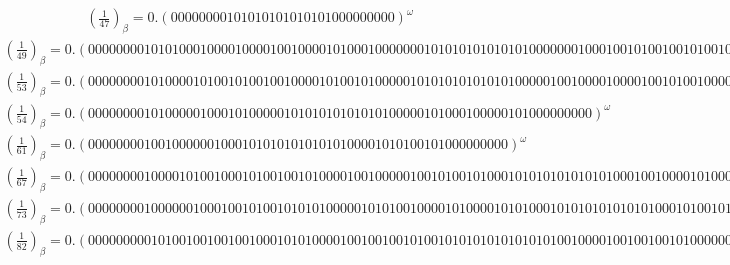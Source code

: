 \documentclass[fleqn]{article}
\begin{document}
\begin{equation*}
\begin{split}
(\frac{1}{47})_\beta = 0.(00000000101010101010101000000000)^\omega
\end{split}\end{equation*}
\begin{equation*}
\begin{split}
(\frac{1}{49})_\beta = 0.(0000000010101000100001000010010000101000100000001010101010101010000000100010010100100101001000100010101000000000)^\omega
\end{split}\end{equation*}
\begin{equation*}
\begin{split}
(\frac{1}{53})_\beta = 0.(000000001010000101001010010010000101001010000010101010101010100000100100001000010010100100001000101000000000)^\omega
\end{split}\end{equation*}
\begin{equation*}
\begin{split}
(\frac{1}{54})_\beta = 0.(000000001010000010001010000010101010101010100000101000100000101000000000)^\omega
\end{split}\end{equation*}
\begin{equation*}
\begin{split}
(\frac{1}{61})_\beta = 0.(000000001001000000100010101010101010100001010100101000000000)^\omega
\end{split}\end{equation*}
\begin{equation*}
\begin{split}
(\frac{1}{67})_\beta = 0.(0000000010000101001000101001001010000100100000100101001010001010101010101010001001000010100000010010001001001010100001000010001000000000)^\omega
\end{split}\end{equation*}
\begin{equation*}
\begin{split}
(\frac{1}{73})_\beta = 0.(0000000010000001000100101001010101000001010100100001010000101010001010101010101010001010010100001000010000000101000000001010010001001000001000000000)^\omega
\end{split}\end{equation*}
\begin{equation*}
\begin{split}
(\frac{1}{82})_\beta = 0.(000000000101001001001001000101010000100100100101001010101010101010100100001001001001010000000100100100100100001000000000)^\omega
\end{split}\end{equation*}
\end{document}
